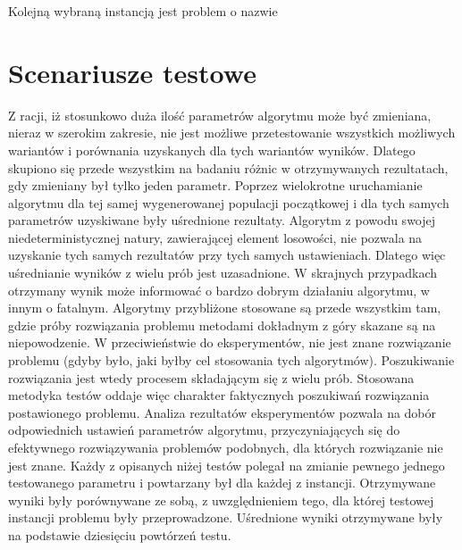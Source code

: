 Kolejną wybraną instancją jest problem o nazwie \textit{}

\section{Scenariusze testowe}
\label{sec:scenariusze}
Z racji, iż stosunkowo duża ilość parametrów algorytmu może być zmieniana, nieraz w szerokim zakresie, nie jest możliwe przetestowanie wszystkich możliwych wariantów i porównania uzyskanych dla tych wariantów wyników. Dlatego skupiono się przede wszystkim na badaniu różnic w otrzymywanych rezultatach, gdy zmieniany był tylko jeden parametr. Poprzez wielokrotne uruchamianie algorytmu dla tej samej wygenerowanej populacji początkowej i dla tych samych parametrów uzyskiwane były uśrednione rezultaty. Algorytm z powodu swojej niedeterministycznej natury, zawierającej element losowości, nie pozwala na uzyskanie tych samych rezultatów przy tych samych ustawieniach. Dlatego więc uśrednianie wyników z wielu prób jest uzasadnione. W skrajnych przypadkach otrzymany wynik może informować o bardzo dobrym działaniu algorytmu, w innym o fatalnym. Algorytmy przybliżone stosowane są przede wszystkim tam, gdzie próby rozwiązania problemu metodami dokładnym z góry skazane są na niepowodzenie. W przeciwieństwie do eksperymentów, nie jest znane rozwiązanie problemu (gdyby było, jaki byłby cel stosowania tych algorytmów). Poszukiwanie rozwiązania jest wtedy procesem składającym się z wielu prób. Stosowana metodyka testów oddaje więc charakter faktycznych poszukiwań rozwiązania postawionego problemu. Analiza rezultatów eksperymentów pozwala na dobór odpowiednich ustawień parametrów algorytmu, przyczyniających się do efektywnego rozwiązywania problemów podobnych, dla których rozwiązanie nie jest znane. Każdy z opisanych niżej testów polegał na zmianie pewnego jednego testowanego parametru i powtarzany był dla każdej z instancji. Otrzymywane wyniki były porównywane ze sobą, z uwzględnieniem tego, dla której testowej instancji problemu były przeprowadzone. Uśrednione wyniki otrzymywane były na podstawie dziesięciu powtórzeń testu.

